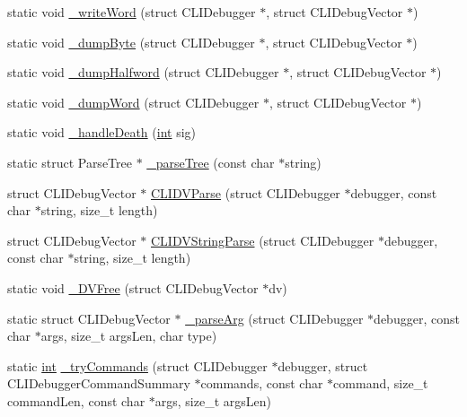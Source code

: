 \begin{DoxyCompactItemize}
\item 
static void \mbox{\hyperlink{debugger_2cli-debugger_8c_aff03320d22a8e46d1af7c43cb84919da}{\+\_\+write\+Word}} (struct C\+L\+I\+Debugger $\ast$, struct C\+L\+I\+Debug\+Vector $\ast$)
\item 
static void \mbox{\hyperlink{debugger_2cli-debugger_8c_aa3f29a9b8e86f5f883ecf4653be807ea}{\+\_\+dump\+Byte}} (struct C\+L\+I\+Debugger $\ast$, struct C\+L\+I\+Debug\+Vector $\ast$)
\item 
static void \mbox{\hyperlink{debugger_2cli-debugger_8c_ac233be27c06307973bd28ec5ca5a8138}{\+\_\+dump\+Halfword}} (struct C\+L\+I\+Debugger $\ast$, struct C\+L\+I\+Debug\+Vector $\ast$)
\item 
static void \mbox{\hyperlink{debugger_2cli-debugger_8c_aaf2f27557df7f8fda64782c14eb6fc0a}{\+\_\+dump\+Word}} (struct C\+L\+I\+Debugger $\ast$, struct C\+L\+I\+Debug\+Vector $\ast$)
\item 
static void \mbox{\hyperlink{debugger_2cli-debugger_8c_a829639f778965123a1bd18bf71a3ffb0}{\+\_\+handle\+Death}} (\mbox{\hyperlink{ioapi_8h_a787fa3cf048117ba7123753c1e74fcd6}{int}} sig)
\item 
static struct Parse\+Tree $\ast$ \mbox{\hyperlink{debugger_2cli-debugger_8c_a27934628b83d6ccd96e46e1765075a98}{\+\_\+parse\+Tree}} (const char $\ast$string)
\item 
struct C\+L\+I\+Debug\+Vector $\ast$ \mbox{\hyperlink{debugger_2cli-debugger_8c_a12f3a50d17ea7ee9edd8703a1e57f1ad}{C\+L\+I\+D\+V\+Parse}} (struct C\+L\+I\+Debugger $\ast$debugger, const char $\ast$string, size\+\_\+t length)
\item 
struct C\+L\+I\+Debug\+Vector $\ast$ \mbox{\hyperlink{debugger_2cli-debugger_8c_a98d7c3768ef0af611a57d21782b34ca1}{C\+L\+I\+D\+V\+String\+Parse}} (struct C\+L\+I\+Debugger $\ast$debugger, const char $\ast$string, size\+\_\+t length)
\item 
static void \mbox{\hyperlink{debugger_2cli-debugger_8c_aba2bca6a3f7315fff75dd95a9f866970}{\+\_\+\+D\+V\+Free}} (struct C\+L\+I\+Debug\+Vector $\ast$dv)
\item 
static struct C\+L\+I\+Debug\+Vector $\ast$ \mbox{\hyperlink{debugger_2cli-debugger_8c_a5fda3702140fba9e4cc65c283462e28b}{\+\_\+parse\+Arg}} (struct C\+L\+I\+Debugger $\ast$debugger, const char $\ast$args, size\+\_\+t args\+Len, char type)
\item 
static \mbox{\hyperlink{ioapi_8h_a787fa3cf048117ba7123753c1e74fcd6}{int}} \mbox{\hyperlink{debugger_2cli-debugger_8c_afe13a4b051acdd4ffee4a8bdaf89651b}{\+\_\+try\+Commands}} (struct C\+L\+I\+Debugger $\ast$debugger, struct C\+L\+I\+Debugger\+Command\+Summary $\ast$commands, const char $\ast$command, size\+\_\+t command\+Len, const char $\ast$args, size\+\_\+t args\+Len)

\end{DoxyCompactItemize}
